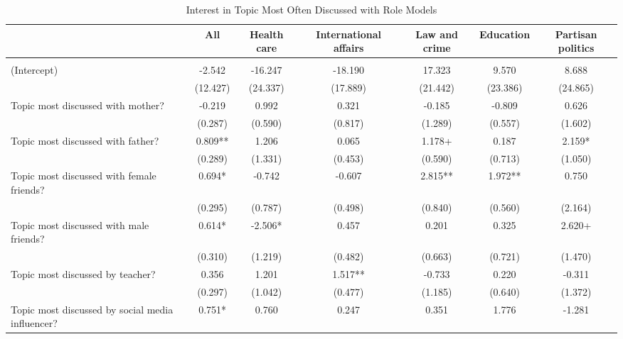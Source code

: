 \documentclass[
  letterpaper,
  DIV=11,
  numbers=noendperiod]{scrreprt}
\begin{document}
\begin{table}
\centering\centering
\caption{Interest in Topic Most Often Discussed with Role Models \label{tab:lmeAgentsCtrl}}
\centering
\fontsize{6}{8}\selectfont
\begin{tabular}[t]{lcccccc}
\toprule
  & All & Health care & International affairs & Law and crime & Education & Partisan politics\\
\midrule
\addlinespace[0.5em]
\multicolumn{7}{l}{\textit{Boys}}\\
\midrule \hspace{1em}(Intercept) & -2.542 & -16.247 & -18.190 & 17.323 & 9.570 & 8.688\\
\hspace{1em} & (12.427) & (24.337) & (17.889) & (21.442) & (23.386) & (24.865)\\
\hspace{1em}Topic most discussed with mother? & -0.219 & 0.992 & 0.321 & -0.185 & -0.809 & 0.626\\
\hspace{1em} & (0.287) & (0.590) & (0.817) & (1.289) & (0.557) & (1.602)\\
\hspace{1em}Topic most discussed with father? & 0.809** & 1.206 & 0.065 & 1.178+ & 0.187 & 2.159*\\
\hspace{1em} & (0.289) & (1.331) & (0.453) & (0.590) & (0.713) & (1.050)\\
\hspace{1em}Topic most discussed with female friends? & 0.694* & -0.742 & -0.607 & 2.815** & 1.972** & 0.750\\
\hspace{1em} & (0.295) & (0.787) & (0.498) & (0.840) & (0.560) & (2.164)\\
\hspace{1em}Topic most discussed with male friends? & 0.614* & -2.506* & 0.457 & 0.201 & 0.325 & 2.620+\\
\hspace{1em} & (0.310) & (1.219) & (0.482) & (0.663) & (0.721) & (1.470)\\
\hspace{1em}Topic most discussed by teacher? & 0.356 & 1.201 & 1.517** & -0.733 & 0.220 & -0.311\\
\hspace{1em} & (0.297) & (1.042) & (0.477) & (1.185) & (0.640) & (1.372)\\
\hspace{1em}Topic most discussed by social media influencer? & 0.751* & 0.760 & 0.247 & 0.351 & 1.776 & -1.281\\

\end{tabular}
\end{table}
\end{document}
